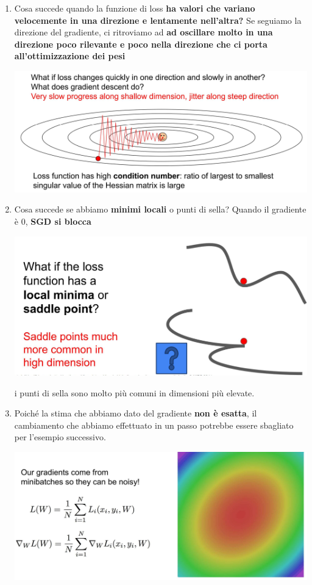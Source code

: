 \documentclass[12pt]{article}
\begin{document}
\begin{enumerate}
    \item Cosa succede quando la funzione di loss \textbf{ha valori che variano velocemente in una direzione e lentamente nell'altra?} Se seguiamo la direzione del gradiente, ci ritroviamo ad \textbf{ad oscillare molto in una direzione poco rilevante e poco nella direzione che ci porta all'ottimizzazione dei pesi}
    \begin{center}
        \includegraphics[width =0.80\linewidth]{Images/165.PNG}
    \end{center}
    \item Cosa succede se abbiamo \textbf{minimi locali} o punti di sella?
     Quando il gradiente è 0, \textbf{SGD si blocca}
    \begin{center}
     \includegraphics[width =0.80\linewidth]{Images/166.PNG}
    \end{center}
    i punti di sella sono molto più comuni in dimensioni più elevate.
    \item Poiché la stima che abbiamo dato del gradiente \textbf{non è esatta}, il cambiamento che abbiamo effettuato in un passo potrebbe essere sbagliato per l'esempio successivo.
    \begin{center}
        \includegraphics[width =0.80\linewidth]{Images/167.PNG}
    \end{center}
\end{enumerate}
\end{document}
